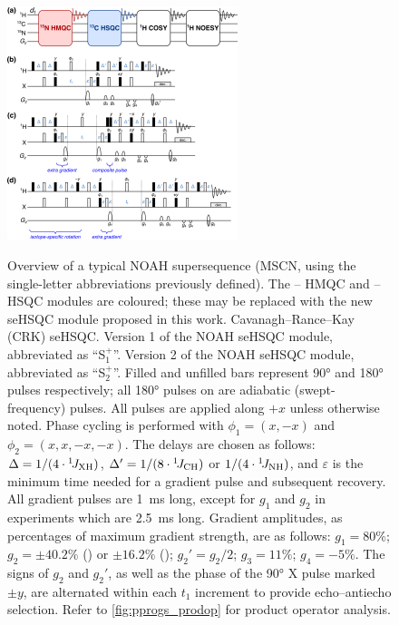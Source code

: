 \documentclass[11pt]{article}
\newcommand*{\noahSpa}{S$^+_1$}
\newcommand*{\noahSpb}{S$^+_2$}
\newcommand*{\carbon}{\ce{^{13}C}}
\newcommand*{\proton}{\ce{^{1}H}}
\newcommand*{\nitrogen}{\ce{^{15}N}}
\newcommand*{\onejxh}{{}^{1}\!J_{\ce{XH}}}
\newcommand*{\onejch}{{}^{1}\!J_{\ce{CH}}}
\newcommand*{\onejnh}{{}^{1}\!J_{\ce{NH}}}
\begin{document}
\begin{figure}
    \centering
    \includegraphics[width=0.6\textwidth]{pprogs.png}
    {\label{fig:pprogs_overview}}
    {\label{fig:pprogs_crk}}
    {\label{fig:pprogs_spv1}}
    {\label{fig:pprogs_spv2}}
    \caption{
        \textbf{} Overview of a typical NOAH supersequence (MSCN, using the single-letter abbreviations previously defined\autocite{Kupce2017ACIE}).
        The \nitrogen{}--\proton{} HMQC and \carbon{}--\proton{} HSQC modules are coloured; these may be replaced with the new seHSQC module proposed in this work.
        \textbf{} Cavanagh--Rance--Kay (CRK) seHSQC.\autocite{sehsqc}
        \textbf{} Version 1 of the NOAH seHSQC module, abbreviated as ``\noahSpa{}''.
        \textbf{} Version 2 of the NOAH seHSQC module, abbreviated as ``\noahSpb{}''.
        Filled and unfilled bars represent \ang{90} and \ang{180} pulses respectively; all \ang{180} pulses on \carbon{} are adiabatic (swept-frequency) pulses.
        All pulses are applied along $+x$ unless otherwise noted.
        Phase cycling is performed with $\phi_1 = (x, -x)$ and $\phi_2 = (x, x, -x, -x)$.
        The delays are chosen as follows: $\Delta = 1/(4\cdot\onejxh)$, $\Delta' = 1/(8\cdot\onejch)$ or $1/(4\cdot\onejnh)$, and $\varepsilon$ is the minimum time needed for a gradient pulse and subsequent recovery.
        All gradient pulses are \SI{1}{\ms} long, except for $g_1$ and $g_2$ in \nitrogen{} experiments which are \SI{2.5}{\ms} long.
        Gradient amplitudes, as percentages of maximum gradient strength, are as follows: $g_1 = 80\%$; $g_2 = \pm 40.2\%$ (\carbon{}) or $\pm 16.2\%$ (\nitrogen{}); ${g_2}' = g_2/2$; $g_3 = 11\%$; $g_4 = -5\%$.
        The signs of $g_2$ and ${g_2}'$, as well as the phase of the \ang{90} X pulse marked $\pm y$, are alternated within each $t_1$ increment to provide echo--antiecho selection.
        Refer to \cref{fig:pprogs_prodop} for product operator analysis.
    }
    \label{fig:pprogs}
\end{figure}
\end{document}
